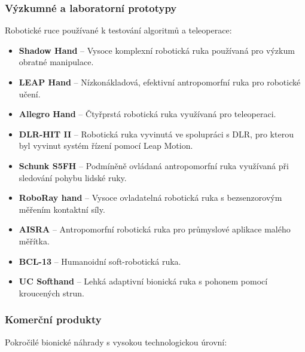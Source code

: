\subsubsection{Výzkumné a laboratorní prototypy}
Robotické ruce používané k testování algoritmů a teleoperace:

\begin{itemize}
    \item \textbf{Shadow Hand} – Vysoce komplexní robotická ruka používaná pro výzkum obratné manipulace.
    \item \textbf{LEAP Hand} – Nízkonákladová, efektivní antropomorfní ruka pro robotické učení.
    \item \textbf{Allegro Hand} – Čtyřprstá robotická ruka využívaná pro teleoperaci.
    \item \textbf{DLR-HIT II} – Robotická ruka vyvinutá ve spolupráci s DLR, pro kterou byl vyvinut systém řízení pomocí Leap Motion.
    \item \textbf{Schunk S5FH} – Podmíněně ovládaná antropomorfní ruka využívaná při sledování pohybu lidské ruky.
    \item \textbf{RoboRay hand} – Vysoce ovladatelná robotická ruka s bezsenzorovým měřením kontaktní síly.
    \item \textbf{AISRA} – Antropomorfní robotická ruka pro průmyslové aplikace malého měřítka.
    \item \textbf{BCL-13} – Humanoidní soft-robotická ruka.
    \item \textbf{UC Softhand} – Lehká adaptivní bionická ruka s pohonem pomocí kroucených strun.
\end{itemize}

\subsubsection{Komerční produkty}
Pokročilé bionické náhrady s vysokou technologickou úrovní:

